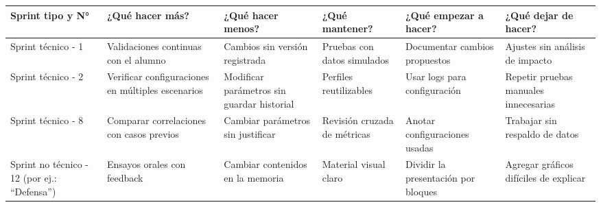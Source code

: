 \documentclass[
11pt, %
]{charter}
\begin{document}
\begin{table}[htpb]
\renewcommand{\arraystretch}{1.4}
\begin{tabular}{|>{\raggedright\arraybackslash}p{1.8cm}|
                >{\raggedright\arraybackslash}p{2.3cm}|
                >{\raggedright\arraybackslash}p{2.3cm}|
                >{\raggedright\arraybackslash}p{2.3cm}|
                >{\raggedright\arraybackslash}p{2.3cm}|
                >{\raggedright\arraybackslash}p{2.3cm}|}
\hline
\rowcolor[HTML]{CCCCCC} 
\textbf{Sprint tipo y N°} & \textbf{¿Qué hacer más?} & \textbf{¿Qué hacer menos?} & \textbf{¿Qué mantener?} & \textbf{¿Qué empezar a hacer?} & \textbf{¿Qué dejar de hacer?} \\
\hline
Sprint técnico - 1 & Validaciones continuas con el alumno & Cambios sin versión registrada & Pruebas con datos simulados & Documentar cambios propuestos & Ajustes sin análisis de impacto \\
\hline
Sprint técnico - 2 & Verificar configuraciones en múltiples escenarios & Modificar parámetros sin guardar historial & Perfiles reutilizables & Usar logs para configuración & Repetir pruebas manuales innecesarias \\
\hline
Sprint técnico - 8 & Comparar correlaciones con casos previos & Cambiar parámetros sin justificar & Revisión cruzada de métricas & Anotar configuraciones usadas & Trabajar sin respaldo de datos \\
\hline
Sprint no técnico - 12 (por ej.: ``Defensa'') & Ensayos orales con feedback & Cambiar contenidos en la memoria & Material visual claro & Dividir la presentación por bloques & Agregar gráficos difíciles de explicar \\
\hline
\end{tabular}
\end{table}
\end{document}
